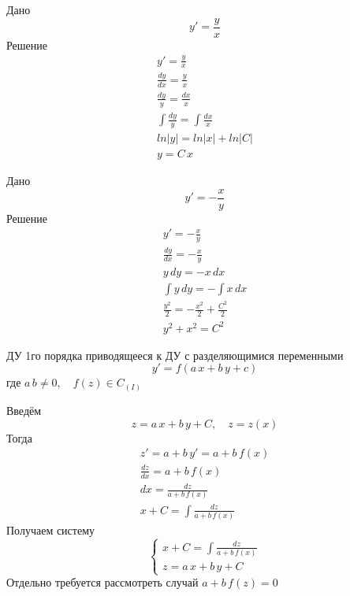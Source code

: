 \begin{Example}
    Дано
    \[
        y' = \frac{y}{x}
    \]
    Решение
    \begin{gather*}
        y' = \frac{y}{x}\\
        \frac{dy}{dx} = \frac{y}{x}\\
        \frac{dy}{y} = \frac{dx}{x}\\
        \int \frac{dy}{y} = \int \frac{dx}{x}\\
        ln|y| = ln|x| + ln|C|\\
        y = C\,x
    \end{gather*}
\end{Example}

\begin{Example}
    Дано
    \[
        y' = -\frac{x}{y}
    \]
    Решение
    \begin{gather*}  
        y' = -\frac{x}{y}\\
        \frac{dy}{dx} = -\frac{x}{y}\\
        y\,dy = -x\,dx\\
        \int y\,dy = - \int x\,dx \\
        \frac{y^2}{2} = - \frac{x^2}{2} + \frac{C^2}{2}\\
        y^2 + x^2 = C^2
    \end{gather*}
\end{Example}

\begin{Def}
    ДУ 1го порядка приводящееся к ДУ с разделяющимися переменными
    \[
        y' = f(a\,x + b\,y + c)
    \]
    где $a\,b \neq 0, \quad f(z) \in C_{(I)}$
\end{Def}

\begin{Note}
    Введём 
    \[
        z = a\,x + b\,y + C, \quad z = z(x)
    \]
    Тогда
    \begin{gather*}
        z' = a + b\,y' =  a + b\,f(x)\\
        \frac{dz}{dx} = a + b\,f(x)\\
        dx = \frac{dz}{a + b\,f(x)}\\
        x + C = \int \frac{dz}{a + b\,f(x)}
    \end{gather*}
    Получаем систему
    \[
        \begin{cases}
            x + C = \int \frac{dz}{a + b\,f(x)}\\
            z = a\,x + b\,y + C
        \end{cases}
    \]
    Отдельно требуется рассмотреть случай $a + b\,f(z) = 0$
\end{Note}

